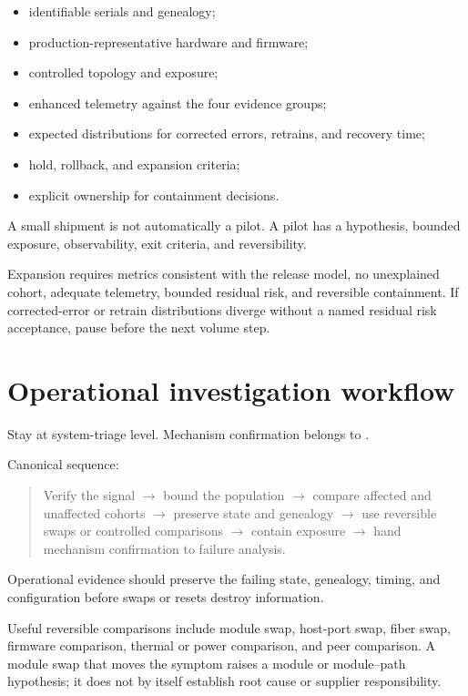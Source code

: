 \begin{itemize}
\item identifiable serials and genealogy;
\item production-representative hardware and firmware;
\item controlled topology and exposure;
\item enhanced telemetry against the four evidence groups;
\item expected distributions for corrected errors, retrains, and recovery time;
\item hold, rollback, and expansion criteria;
\item explicit ownership for containment decisions.
\end{itemize}

A small shipment is not automatically a pilot. A pilot has a hypothesis,
bounded exposure, observability, exit criteria, and reversibility.

Expansion requires metrics consistent with the release model, no unexplained
cohort, adequate telemetry, bounded residual risk, and reversible containment.
If corrected-error or retrain distributions diverge without a named residual
risk acceptance, pause before the next volume step.

\section{Operational investigation workflow}
\label{sec:ops-investigation}

Stay at system-triage level. Mechanism confirmation belongs to
.

Canonical sequence:

\begin{quote}
\noindent Verify the signal
$\rightarrow$ bound the population
$\rightarrow$ compare affected and unaffected cohorts
$\rightarrow$ preserve state and genealogy
$\rightarrow$ use reversible swaps or controlled comparisons
$\rightarrow$ contain exposure
$\rightarrow$ hand mechanism confirmation to failure analysis.
\end{quote}

Operational evidence should preserve the failing state, genealogy, timing, and
configuration before swaps or resets destroy information.

Useful reversible comparisons include module swap, host-port swap, fiber swap,
firmware comparison, thermal or power comparison, and peer comparison. A module
swap that moves the symptom raises a module or module--path hypothesis; it does
not by itself establish root cause or supplier responsibility.

